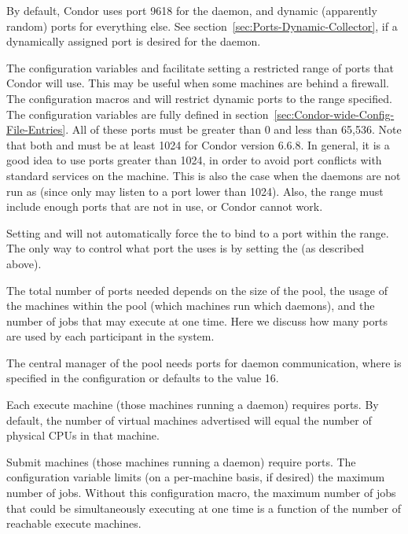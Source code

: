 By default,
Condor uses port 9618 for the  daemon,
and dynamic (apparently random) ports for everything else.
See section~\ref{sec:Ports-Dynamic-Collector},
if a dynamically assigned port is desired for the
 daemon.

The configuration variables
 and  facilitate setting a restricted
range of ports that Condor will use.
This may be useful when some machines are behind a firewall.
The configuration macros
 and  
will restrict dynamic ports to the range specified.
The configuration variables are fully defined
in section~\ref{sec:Condor-wide-Config-File-Entries}.
All of these ports must be greater than 0 and less than 65,536.
Note that both  and  must be at 
least 1024 for Condor version 6.6.8.
In general, it is a good idea to use ports greater than 1024,
in order
to avoid port conflicts with standard services on the machine.
This is also
the case when the daemons are not run as 
(since only  may listen to a port lower than 1024).
Also, the range must include enough ports that are not in use, 
or Condor cannot work.

\Note Setting  and  will not
automatically force the  to bind to a port within
the range.
The only way to control what port the  uses is by
setting the  (as described above).

The total number of ports needed depends on the size of the pool,
the usage of the machines within the pool (which machines
run which daemons),
and the number of jobs that may execute at one time.
Here we discuss how many ports are used by each
participant in the system.

The central manager of the pool needs
ports for daemon communication,
where 
is specified in the
configuration or defaults to the value 16.

Each execute machine (those machines running a  daemon)
requires
ports.
By default, the number of virtual machines advertised
will equal the number of physical CPUs in that machine.

Submit machines (those machines running a  daemon)
require
 ports.
The configuration variable 
limits (on a per-machine basis, if desired)
the maximum number of jobs.
Without this configuration macro,
the maximum number of jobs that could be simultaneously
executing at one time
is a function of the number of reachable execute machines. 

